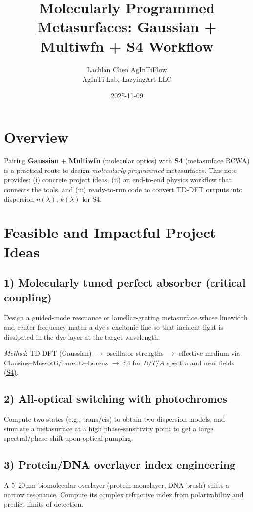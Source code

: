 \documentclass[11pt,a4paper]{article}
\title{Molecularly Programmed Metasurfaces: Gaussian + Multiwfn + S4 Workflow}
\author{\begin{tabular}{c}Lachlan Chen \quad AgInTiFlow\\AgInTi Lab, LazyingArt LLC\end{tabular}}
\date{2025-11-09}
\begin{document}
\maketitle

\section{Overview}

Pairing \textbf{Gaussian} + \textbf{Multiwfn} (molecular optics) with \textbf{S4} (metasurface RCWA) is a practical route to design \emph{molecularly programmed} metasurfaces. This note provides: (i) concrete project ideas, (ii) an end-to-end physics workflow that connects the tools, and (iii) ready-to-run code to convert TD-DFT outputs into dispersion $n(\lambda),\,k(\lambda)$ for S4.

\section{Feasible and Impactful Project Ideas}

\subsection*{1) Molecularly tuned perfect absorber (critical coupling)}
Design a guided-mode resonance or lamellar-grating metasurface whose linewidth and center frequency match a dye's excitonic line so that incident light is dissipated in the dye layer at the target wavelength.

\emph{Method}: TD-DFT (Gaussian) $\rightarrow$ oscillator strengths $\rightarrow$ effective medium via Clausius--Mossotti/Lorentz--Lorenz $\rightarrow$ S4 for $R/T/A$ spectra and near fields \href{https://web.stanford.edu/group/fan/publication/Liu_ComputerPhysicsCommunications_183_2233_2012.pdf}{(S4)}.

\subsection*{2) All-optical switching with photochromes}
Compute two states (e.g., trans/cis) to obtain two dispersion models, and simulate a metasurface at a high phase-sensitivity point to get a large spectral/phase shift upon optical pumping.

\subsection*{3) Protein/DNA overlayer index engineering}
A 5--20\,nm biomolecular overlayer (protein monolayer, DNA brush) shifts a narrow resonance. Compute its complex refractive index from polarizability and predict limits of detection.
\end{document}
